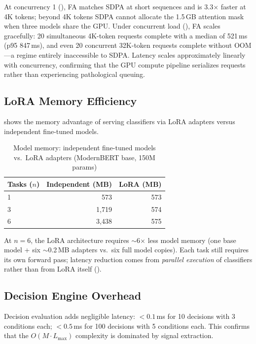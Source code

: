 At concurrency 1 (), FA matches SDPA at short sequences and is 3.3$\times$ faster at 4K tokens; beyond 4K tokens SDPA cannot allocate the 1.5\,GB attention mask when three models share the GPU.
Under concurrent load (), FA scales gracefully: 20 simultaneous 4K-token requests complete with a median of 521\,ms (p95 847\,ms), and even 20 concurrent 32K-token requests complete without OOM---a regime entirely inaccessible to SDPA.
Latency scales approximately linearly with concurrency, confirming that the GPU compute pipeline serializes requests rather than experiencing pathological queuing.

\subsection{LoRA Memory Efficiency}

 shows the memory advantage of serving classifiers via LoRA adapters versus independent fine-tuned models.

\begin{table}[htbp]
\centering
\caption{Model memory: independent fine-tuned models vs.\ LoRA adapters (ModernBERT base, 150M params)}
\label{tab:lora_memory}
\begin{tabular}{lrr}
\toprule
\textbf{Tasks ($n$)} & \textbf{Independent (MB)} & \textbf{LoRA (MB)} \\
\midrule
1 & 573   & 573 \\
3 & 1{,}719 & 574 \\
6 & 3{,}438 & 575 \\
\bottomrule
\end{tabular}
\end{table}

At $n = 6$, the LoRA architecture requires $\sim$6$\times$ less model memory (one base model + six $\sim$0.2\,MB adapters vs.\ six full model copies).
Each task still requires its own forward pass; latency reduction comes from \emph{parallel execution} of classifiers rather than from LoRA itself ().

\subsection{Decision Engine Overhead}

Decision evaluation adds negligible latency:
$< 0.1$\,ms for 10 decisions with 3 conditions each;
$< 0.5$\,ms for 100 decisions with 5 conditions each.
This confirms that the $O(M \cdot L_\text{max})$ complexity is dominated by signal extraction.

